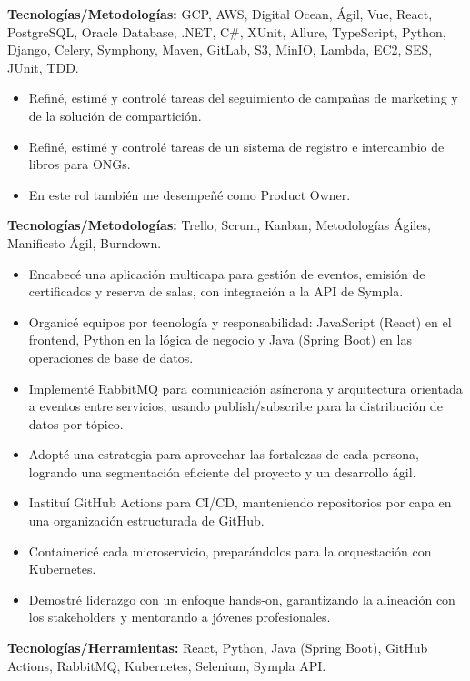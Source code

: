 \documentclass[10pt,a4paper]{altacv}
\begin{document}
\textbf{Tecnologías/Metodologías:} GCP, AWS, Digital Ocean, Ágil, Vue, React, PostgreSQL, Oracle Database, .NET, C\#, XUnit, Allure, TypeScript, Python, Django, Celery, Symphony, Maven, GitLab, S3, MinIO, Lambda, EC2, SES, JUnit, TDD.
\vspace{5mm}

\begin{itemize}
    \setlength{\itemindent}{0.5em}
    \item[--] Refiné, estimé y controlé tareas del seguimiento de campañas de marketing y de la solución de compartición.
    \item[--] Refiné, estimé y controlé tareas de un sistema de registro e intercambio de libros para ONGs.
    \item[--] En este rol también me desempeñé como Product Owner.
\end{itemize}
\textbf{Tecnologías/Metodologías:} Trello, Scrum, Kanban, Metodologías Ágiles, Manifiesto Ágil, Burndown.
\vspace{5mm}


\break
{}

\begin{itemize}
    \setlength{\itemindent}{0.5em}
    \item[--] Encabecé una aplicación multicapa para gestión de eventos, emisión de certificados y reserva de salas, con integración a la API de Sympla.
    \item[--] Organicé equipos por tecnología y responsabilidad: JavaScript (React) en el frontend, Python en la lógica de negocio y Java (Spring Boot) en las operaciones de base de datos.    
    \item[--] Implementé RabbitMQ para comunicación asíncrona y arquitectura orientada a eventos entre servicios, usando publish/subscribe para la distribución de datos por tópico.
    \item[--] Adopté una estrategia para aprovechar las fortalezas de cada persona, logrando una segmentación eficiente del proyecto y un desarrollo ágil.
    \item[--] Instituí GitHub Actions para CI/CD, manteniendo repositorios por capa en una organización estructurada de GitHub.
    \item[--] Containericé cada microservicio, preparándolos para la orquestación con Kubernetes.
    \item[--] Demostré liderazgo con un enfoque hands-on, garantizando la alineación con los stakeholders y mentorando a jóvenes profesionales.
\end{itemize}
\textbf{Tecnologías/Herramientas:} React, Python, Java (Spring Boot), GitHub Actions, RabbitMQ, Kubernetes, Selenium, Sympla API.
\end{document}
